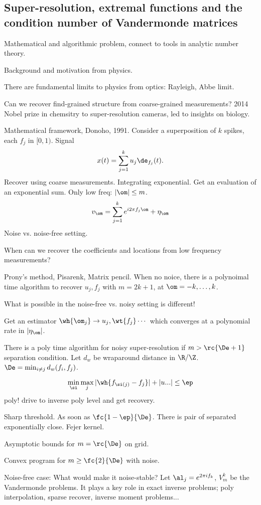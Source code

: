 \subsection{Super-resolution, extremal functions and the condition number of Vandermonde matrices}

Mathematical and algorithmic problem, connect to tools in analytic number theory.

Background and motivation from physics. 

There are fundamental limits to physics from optics: Rayleigh, Abbe limit. 

Can we recover find-grained structure from coarse-grained measurements?
2014 Nobel prize in chemsitry to super-resolution cameras, led to insights on biology.

Mathematical framework, Donoho, 1991. Consider a superposition of $k$ spikes, each $f_j$ in $[0,1)$. Signal
\[
x(t)=\sum_{j=1}^k u_j\de_{f_j}(t).
\]
Recover using coarse measurements. Integrating exponential. Get an evaluation of an exponential sum.
Only low freq: $|\om|\le m$.
\[
v_{\om} =\sum_{j=1}^k e^{i2\pi f_j\om}+\eta_\om
\]
Noise vs. noise-free setting.

When can we recover the coefficients and locations from low frequency measurements?

Prony's method, Pisarenk, Matrix pencil.
When no noice, there is a polynoimal time algorithm to recover $u_j,f_j$ with $m=2k+1$, at $\om=-k,\ldots, k$. 

What is possible in the noise-free vs. noisy setting is different!

Get an estimator $\wh{\om_j}\to u_j, \wt{f_j}\cdots $ which converges at a polynomial rate in $|\eta_\om|$.

There is a poly time algorithm for noisy super-resolution if $m>\rc{\De+1}$ separation condition. Let $d_w$ be wraparound distance in $\R/\Z$. $\De=\min_{i\ne j} d_w(f_i,f_j)$. %

\[
\min_\si\max_j|\wh{f_{\si(j)}-f_j}|+|u...|\le \ep
\]
poly!
drive to inverse poly level and get recovery.

Sharp threshold. As soon as $\fc{1-\ep}{\De}$. There is pair of separated exponentially close. Fejer kernel.

Asymptotic bounds for $m=\rc{\De}$ on grid.

Convex program for $m\ge \fc{2}{\De}$ with noise. 

Noise-free case: What would make it noise-stable? Let $\al_j=e^{2\pi i f_k}$, $V_m^k$ be the Vandermonde problems. It plays a key role in exact inverse problems; poly interpolation, sparse recover, inverse moment problems...

